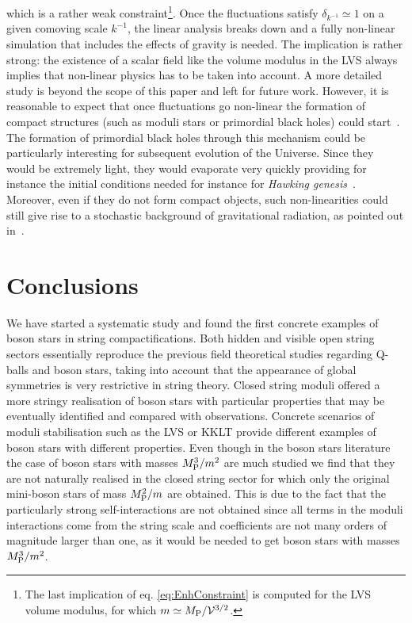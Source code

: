 \documentclass[11pt,a4paper]{article}
\newcommand{\V}{\mathcal{V}}
\begin{document}
which is a rather weak constraint\footnote{The last implication of eq. \eqref{eq:EnhConstraint} is computed for the LVS volume modulus, for which $m \simeq M_{\rm P}/\V^{3/2}$.}. Once the fluctuations satisfy $\delta_{k^{-1}} \simeq 1$ on a given comoving scale $k^{-1}$, the linear analysis breaks down and a fully non-linear simulation that includes the effects of gravity is needed. The implication is rather strong: the existence of a scalar field like the volume modulus in the LVS always implies that non-linear physics has to be taken into account. A more detailed study is beyond the scope of this paper and left for future work. However, it is reasonable to expect that once fluctuations go non-linear the formation of compact structures (such as moduli stars or primordial black holes) could start~\cite{Jedamzik:2010dq}. The formation of primordial black holes through this mechanism could be particularly interesting for subsequent evolution of the Universe. Since they would be extremely light, they would evaporate very quickly providing for instance the initial conditions needed for instance for \textit{Hawking genesis}~\cite{Lennon:2017tqq}. Moreover, even if they do not form compact objects, such non-linearities could still give rise to a stochastic background of gravitational radiation, as pointed out in~\cite{Assadullahi:2009nf}.


\section{Conclusions}
\label{sec:Conclusions}

We have started a systematic study and  found the first concrete examples of boson stars in string compactifications. Both hidden and visible open string sectors essentially reproduce the previous field theoretical studies regarding Q-balls and boson stars, taking into account that the appearance of global symmetries is very restrictive in string theory. Closed string moduli offered a more stringy realisation of boson stars with particular properties that may be eventually identified and compared with observations. Concrete scenarios of moduli stabilisation such as the LVS or KKLT provide different examples of boson stars with different properties. Even though in the boson stars literature the case of boson stars with masses $M_{\rm P}^3/m^2$ are much studied we find that they are not naturally realised in the closed string sector for which only the original mini-boson stars of mass $M_{\rm P}^2/m$ are obtained. This is due to the fact that the particularly strong self-interactions are not obtained since all terms in the moduli interactions come from the string scale and coefficients are not many orders of magnitude larger than one, as it would be needed to get boson stars with masses $M_{\rm P}^3/m^2$. 
\end{document}
